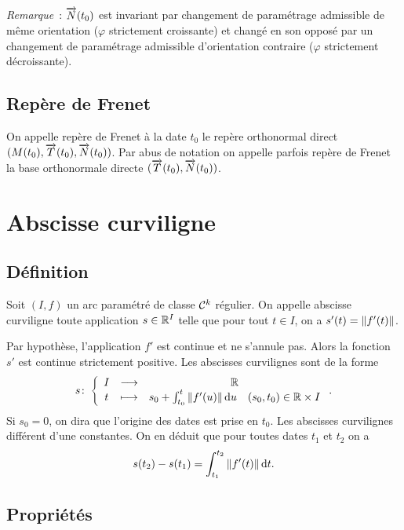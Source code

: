 \emph{Remarque}~: $\overrightarrow{N}(t_0)$ est invariant par changement de paramétrage admissible de même orientation ($\varphi$ strictement croissante) et changé en son opposé par un changement de paramétrage admissible d'orientation contraire ($\varphi$ strictement décroissante).

\subsection{Repère de Frenet}

\begin{defdef}
  On appelle repère de Frenet à la date $t_0$ le repère orthonormal direct $(M(t_0), \overrightarrow{T}(t_0), \overrightarrow{N}(t_0))$. Par abus de notation on appelle parfois repère de Frenet la base orthonormale directe $(\overrightarrow{T}(t_0), \overrightarrow{N}(t_0))$.
\end{defdef}

\section{Abscisse curviligne}

\subsection{Définition}

\begin{defdef}
  Soit $(I, f)$ un arc paramétré de classe $\mathcal{C}^{k}$ régulier. On appelle abscisse curviligne toute application $s \in \mathbb{R}^I$ telle que pour tout $t \in I$, on a $s'(t)=\left\lVert f'(t)\right\rVert$.
\end{defdef}

Par hypothèse, l'application $f'$ est continue et ne s'annule pas. Alors la fonction $s'$ est continue strictement positive. Les abscisses curvilignes sont de la forme
\begin{equation}
  s\colon \left\{\begin{array}{ccc} I & \longrightarrow &\mathbb{R}\\ t & \longmapsto & s_0 + \int_{t_0}^t \left\lVert f'(u)\right\rVert\mathop{}\mathopen{}\mathrm{d} u \quad (s_0, t_0) \in \mathbb{R} \times I \end{array} \right..
\end{equation}
Si $s_0=0$, on dira que l'origine des dates est prise en $t_0$. Les abscisses curvilignes différent d'une constantes. On en déduit que pour toutes dates $t_1$ et $t_2$ on a
\begin{equation}
  s(t_2)-s(t_1) = \int_{t_1}^{t_2} \left\lVert f'(t)\right\rVert\mathop{}\mathopen{}\mathrm{d} t.
\end{equation}

\subsection{Propriétés}

